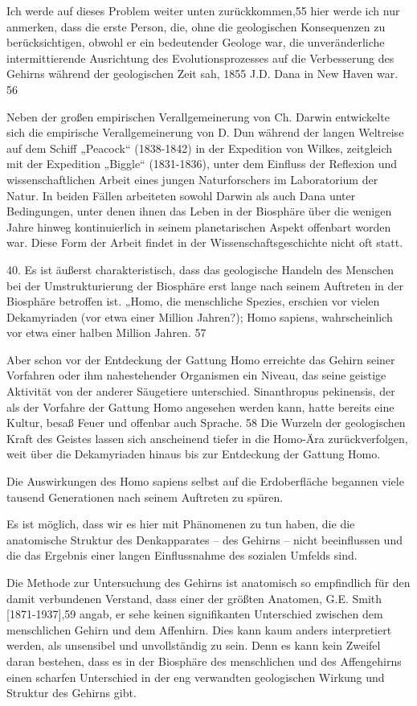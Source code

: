 \documentclass[11pt,a4paper]{book}
\begin{document}
Ich werde auf dieses Problem weiter unten zurückkommen,55 hier werde ich nur anmerken, dass die erste Person, die, ohne die geologischen Konsequenzen zu berücksichtigen, obwohl er ein bedeutender Geologe war, die unveränderliche intermittierende Ausrichtung des Evolutionsprozesses auf die Verbesserung des Gehirns während der geologischen Zeit sah, 1855 J.D. Dana in New Haven war. 56 

Neben der großen empirischen Verallgemeinerung von Ch. Darwin entwickelte sich die empirische Verallgemeinerung von D. Dun während der langen Weltreise auf dem Schiff „Peacock“ (1838-1842) in der Expedition von Wilkes, zeitgleich mit der Expedition „Biggle“ (1831-1836), unter dem Einfluss der Reflexion und wissenschaftlichen Arbeit eines jungen Naturforschers im Laboratorium der Natur. In beiden Fällen arbeiteten sowohl Darwin als auch Dana unter Bedingungen, unter denen ihnen das Leben in der Biosphäre über die wenigen Jahre hinweg kontinuierlich in seinem planetarischen Aspekt offenbart worden war. Diese Form der Arbeit findet in der Wissenschaftsgeschichte nicht oft statt. 

40. Es ist äußerst charakteristisch, dass das geologische Handeln des Menschen bei der Umstrukturierung der Biosphäre erst lange nach seinem Auftreten in der Biosphäre betroffen ist. „Homo, die menschliche Spezies, erschien vor vielen Dekamyriaden (vor etwa einer Million Jahren?); Homo sapiens, wahrscheinlich vor etwa einer halben Million Jahren. 57 

Aber schon vor der Entdeckung der Gattung Homo erreichte das Gehirn seiner Vorfahren oder ihm nahestehender Organismen ein Niveau, das seine geistige Aktivität von der anderer Säugetiere unterschied. Sinanthropus pekinensis, der als der Vorfahre der Gattung Homo angesehen werden kann, hatte bereits eine Kultur, besaß Feuer und offenbar auch Sprache. 58 Die Wurzeln der geologischen Kraft des Geistes lassen sich anscheinend tiefer in die Homo-Ära zurückverfolgen, weit über die Dekamyriaden hinaus bis zur Entdeckung der Gattung Homo. 

Die Auswirkungen des Homo sapiens selbst auf die Erdoberfläche begannen viele tausend Generationen nach seinem Auftreten zu spüren. 

Es ist möglich, dass wir es hier mit Phänomenen zu tun haben, die die anatomische Struktur des Denkapparates -- des Gehirns -- nicht beeinflussen und die das Ergebnis einer langen Einflussnahme des sozialen Umfelds sind. 

Die Methode zur Untersuchung des Gehirns ist anatomisch so empfindlich für den damit verbundenen Verstand, dass einer der größten Anatomen, G.E. Smith [1871-1937],59 angab, er sehe keinen signifikanten Unterschied zwischen dem menschlichen Gehirn und dem Affenhirn. Dies kann kaum anders interpretiert werden, als unsensibel und unvollständig zu sein. Denn es kann kein Zweifel daran bestehen, dass es in der Biosphäre des menschlichen und des Affengehirns einen scharfen Unterschied in der eng verwandten geologischen Wirkung und Struktur des Gehirns gibt. 
\end{document}
